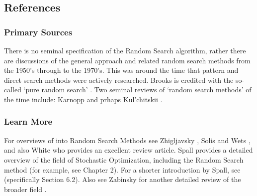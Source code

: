 

\subsection{References}

% 
% 
\subsubsection{Primary Sources}
There is no seminal specification of the Random Search algorithm, rather there are discussions of the general approach and related random search methods from the 1950's through to the 1970's. This was around the time that pattern and direct search methods were actively researched.
Brooks is credited with the so-called `pure random search' \cite{Brooks1958}. Two seminal reviews of `random search methods' of the time include: Karnopp \cite{Karnopp1963} and prhaps Kul'chitskii \cite{Kul'chitskii1976}.

% 
% 
\subsubsection{Learn More}
For overviews of into Random Search Methods see Zhigljavsky \cite{Zhigljavsky1991}, Solis and Wets \cite{Solis1981}, and also White \cite{White1971} who provides an excellent review article.
Spall provides a detailed overview of the field of Stochastic Optimization, including the Random Search method \cite{Spall2003} (for example, see Chapter 2). For a shorter introduction by Spall, see \cite{Spall2004} (specifically Section 6.2). Also see Zabinsky for another detailed review of the broader field \cite{Zabinsky2003}.

